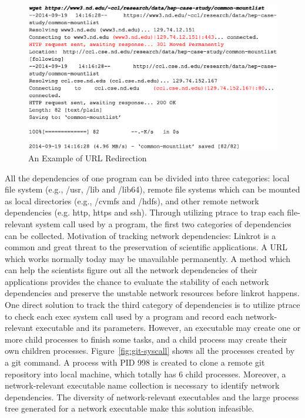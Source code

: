 \begin{figure}
\centering
\includegraphics[width=.6\textwidth]{url_redirection.eps}
\caption{An Example of URL Redirection}
\label{fig:url_redirection}
\end{figure}

All the dependencies of one program can be divided into three categories: local file system (e.g., /usr, /lib and /lib64), remote file systems which can be mounted as local directories (e.g., /cvmfs and /hdfs), and other remote network dependencies (e.g. http, https and ssh).
Through utilizing ptrace to trap each file-relevant system call used by a program, the first two categories of dependencies can be collected. 
Motivation of tracking network dependencies: Linkrot is a common and great threat to the preservation of scientific applications. A URL which works normally today may be unavailable permanently. A method which can help the scientists figure out all the network dependencies of their applications provides the chance to evaluate the stability of each network dependencies and preserve the unstable network resources before linkrot happens.
One direct solution to track the third category of dependencies is to utilize ptrace to check each exec system call used by a program and record each network-relevant executable and its parameters. However, an executable may create one or more child processes to finish some tasks, and a child process may create their own children processes. Figure~\ref{fig:git-syscall} shows all the processes created by a git command. A process with PID 998 is created to clone a remote git repository into local machine, which totally has 6 child processes. Moreover, a network-relevant executable name collection is necessary to identify network dependencies. The diversity of network-relevant executables and the large process tree generated for a network executable make this solution infeasible.

